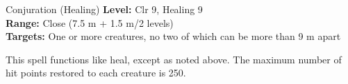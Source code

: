{Conjuration (Healing)}
{
	\textbf{Level:}
	Clr 9, Healing 9\\
	\textbf{Range:}
	Close (7.5 m + 1.5 m/2 levels)\\
	\textbf{Targets:}
	One or more creatures, no two of which can be more than 9 m apart\\
}
{
	This spell functions like heal, except as noted above. The maximum number of hit points restored to each creature is 250.

}
